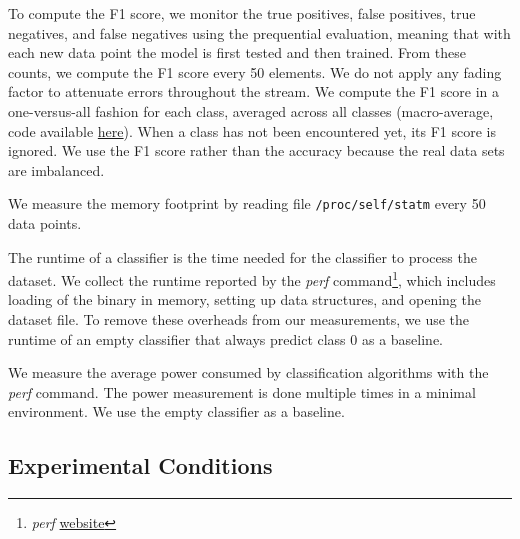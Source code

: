 To compute the F1 score, we monitor the true positives, false positives, true
negatives, and false negatives using the prequential evaluation, meaning that
with each new data point the model is first tested and then trained.  From these
counts, we compute the F1 score every 50 elements. We do not apply any fading
factor to attenuate errors throughout the stream.  We compute the F1 score in a
one-versus-all fashion for each class, averaged across all classes
(macro-average, code available
\href{https://github.com/azazel7/paper-benchmark/blob/9adb1039c5a65a00a66d554f0e870d14d3fff7cb/main.cpp\#L82}{here}).
When a class has not been encountered yet, its F1 score is ignored. We use the
F1 score rather than the accuracy because the real data sets are imbalanced.

We measure the memory footprint by reading file
\texttt{/proc/self/statm} every 50 data points.

The runtime of a classifier is the time needed for
the classifier to process the dataset. We
collect the runtime reported by the \textit{perf}
command\footnote{\textit{perf}
\href{https://perf.wiki.kernel.org/index.php/Main_Page}{website}}, which
includes loading of the binary in memory, setting up data structures, and
opening the dataset file. To remove these overheads from our measurements,
we use the runtime of an empty classifier that always predict class 0 as a baseline.

We measure the average power consumed by classification
algorithms with the \textit{perf} command. The power measurement is done
multiple times in a minimal environment. We use the empty classifier as a
baseline.

\subsection{Experimental Conditions }

